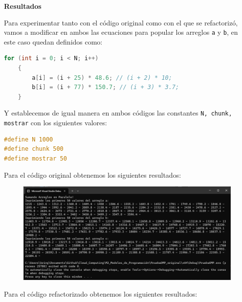 \documentclass[12pt,a4paper]{article}
\begin{document}
\vspace{1em}

\textbf{Resultados}

\vspace{1em}

Para experimentar tanto con el código original como con el que se refactorizó, vamos a modificar en ambos las ecuaciones para popular los arreglos \texttt{a} y \texttt{b}, en este caso quedan definidos como:

\begin{lstlisting}[language=C, numbers=none]
    for (int i = 0; i < N; i++)
    {
        a[i] = (i + 25) * 48.6; // (i + 2) * 10;
        b[i] = (i + 77) * 150.7; // (i + 3) * 3.7;
    }
\end{lstlisting}

Y establecemos de igual manera en ambos códigos las constantes \texttt{N, chunk, mostrar} con los siguientes valores:

\begin{lstlisting}[language=C, numbers=none]
#define N 1000
#define chunk 500
#define mostrar 50
\end{lstlisting}

\vspace{1em}

Para el código original obtenemos los siguientes resultados:

\begin{figure}[H]
    \centering
    \includegraphics[width=1\linewidth]{M2_Modelos_de_Programación/reporte/figuras/Código_original_resultados.png}
    \label{fig:Código_original_resultados}
\end{figure}

Para el código refactorizado obtenemos los siguientes resultados:
\end{document}
